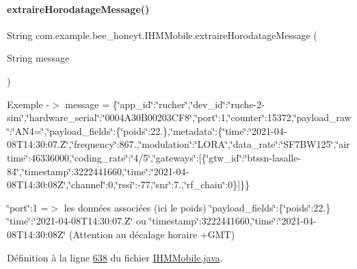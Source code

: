 \paragraph{\texorpdfstring{extraire\+Horodatage\+Message()}{extraireHorodatageMessage()}}
{\footnotesize\ttfamily String com.\+example.\+bee\+\_\+honeyt.\+I\+H\+M\+Mobile.\+extraire\+Horodatage\+Message (\begin{DoxyParamCaption}\item[{String}]{message }\end{DoxyParamCaption})\hspace{0.3cm}{\ttfamily [private]}}

Exemple -\/$>$ message = \{\char`\"{}app\+\_\+id\char`\"{}\+:\char`\"{}rucher\char`\"{},\char`\"{}dev\+\_\+id\char`\"{}\+:\char`\"{}ruche-\/2-\/sim\char`\"{},\char`\"{}hardware\+\_\+serial\char`\"{}\+:\char`\"{}0004\+A30\+B00203\+C\+F8\char`\"{},\char`\"{}port\char`\"{}\+:1,\char`\"{}counter\char`\"{}\+:15372,\char`\"{}payload\+\_\+raw\char`\"{}\+:\char`\"{}\+A\+N4=\char`\"{},\char`\"{}payload\+\_\+fields\char`\"{}\+:\{\char`\"{}poids\char`\"{}\+:22.\},\char`\"{}metadata\char`\"{}\+:\{\char`\"{}time\char`\"{}\+:\char`\"{}2021-\/04-\/08\+T14\+:30\+:07.\+Z\char`\"{},\char`\"{}frequency\char`\"{}\+:867.,\char`\"{}modulation\char`\"{}\+:\char`\"{}\+L\+O\+R\+A\char`\"{},\char`\"{}data\+\_\+rate\char`\"{}\+:\char`\"{}\+S\+F7\+B\+W125\char`\"{},\char`\"{}airtime\char`\"{}\+:46336000,\char`\"{}coding\+\_\+rate\char`\"{}\+:\char`\"{}4/5\char`\"{},\char`\"{}gateways\char`\"{}\+:\mbox{[}\{\char`\"{}gtw\+\_\+id\char`\"{}\+:\char`\"{}btssn-\/lasalle-\/84\char`\"{},\char`\"{}timestamp\char`\"{}\+:3222441660,\char`\"{}time\char`\"{}\+:\char`\"{}2021-\/04-\/08\+T14\+:30\+:08\+Z\char`\"{},\char`\"{}channel\char`\"{}\+:0,\char`\"{}rssi\char`\"{}\+:-\/77,\char`\"{}snr\char`\"{}\+:7.,\char`\"{}rf\+\_\+chain\char`\"{}\+:0\}\mbox{]}\}\}

\char`\"{}port\char`\"{}\+:1 =$>$ les données associées (ici le poids) \char`\"{}payload\+\_\+fields\char`\"{}\+:\{\char`\"{}poids\char`\"{}\+:22.\} \char`\"{}time\char`\"{}\+:\char`\"{}2021-\/04-\/08\+T14\+:30\+:07.\+Z\char`\"{} ou \char`\"{}timestamp\char`\"{}\+:3222441660,\char`\"{}time\char`\"{}\+:\char`\"{}2021-\/04-\/08\+T14\+:30\+:08\+Z\char`\"{} (Attention au décalage horaire +\+G\+MT)

Définition à la ligne \hyperlink{_i_h_m_mobile_8java_source_l00638}{638} du fichier \hyperlink{_i_h_m_mobile_8java_source}{I\+H\+M\+Mobile.\+java}.



